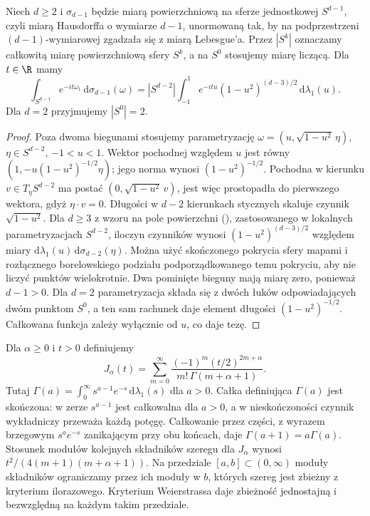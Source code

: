 \begin{lemat}
\label{lem:dt-fourier-sphere-kernel}
Niech $d\ge2$ i $\sigma_{d-1}$ będzie miarą powierzchniową
na sferze jednostkowej $S^{d-1}$, czyli miarą Hausdorffa
o wymiarze $d-1$, unormowaną tak, by na podprzestrzeni
$(d-1)$-wymiarowej zgadzała się z miarą Lebesgue'a.
Przez $|S^k|$ oznaczamy całkowitą miarę powierzchniową
sfery $S^k$, a na $S^0$ stosujemy miarę liczącą.
Dla $t\in\R$ mamy
\[
 \int_{S^{d-1}}e^{-it\omega_1}\,\mathrm d\sigma_{d-1}(\omega)
 =|S^{d-2}|\int_{-1}^1 e^{-itu}(1-u^2)^{(d-3)/2}
 \,\mathrm d\lambda_1(u).
\]
Dla $d=2$ przyjmujemy $|S^0|=2$.
\end{lemat}
\begin{proof}
Poza dwoma biegunami stosujemy parametryzację
$\omega=(u,\sqrt{1-u^2}\,\eta)$, $\eta\in S^{d-2}$,
$-1<u<1$. Wektor pochodnej względem $u$ jest równy
$(1,-u(1-u^2)^{-1/2}\eta)$; jego norma wynosi
$(1-u^2)^{-1/2}$. Pochodna w kierunku
$v\in T_\eta S^{d-2}$ ma postać
$(0,\sqrt{1-u^2}\,v)$, jest więc prostopadła do
pierwszego wektora, gdyż $\eta\cdot v=0$. Długości w $d-2$ kierunkach stycznych
skaluje czynnik $\sqrt{1-u^2}$. Dla $d\ge3$ z wzoru na pole
powierzchni (),
zastosowanego w lokalnych parametryzacjach $S^{d-2}$,
iloczyn czynników wynosi
$(1-u^2)^{(d-3)/2}$ względem miary
$\mathrm d\lambda_1(u)\,\mathrm d\sigma_{d-2}(\eta)$.
Można użyć skończonego pokrycia sfery mapami i rozłącznego
borelowskiego podziału podporządkowanego temu pokryciu,
aby nie liczyć punktów wielokrotnie. Dwa pominięte
bieguny mają miarę zero, ponieważ $d-1>0$.
Dla $d=2$ parametryzacja składa się z dwóch łuków
odpowiadających dwóm punktom $S^0$, a ten sam
rachunek daje element długości $(1-u^2)^{-1/2}$.
Całkowana funkcja zależy wyłącznie od $u$, co daje tezę.
\end{proof}

\begin{definicja}
\label{def:dt-bessel-j}
Dla $\alpha\ge0$ i $t>0$ definiujemy
\[
 J_\alpha(t)=\sum_{m=0}^\infty
 \frac{(-1)^m(t/2)^{2m+\alpha}}
      {m!\,\Gamma(m+\alpha+1)}.
\]
Tutaj $\Gamma(a)=\int_0^\infty
s^{a-1}e^{-s}\,\mathrm d\lambda_1(s)$ dla $a>0$.
Całka definiująca $\Gamma(a)$ jest skończona:
w zerze $s^{a-1}$ jest całkowalna dla $a>0$,
a w nieskończoności czynnik wykładniczy przeważa
każdą potęgę. Całkowanie przez części, z wyrazem
brzegowym $s^ae^{-s}$ zanikającym przy obu końcach,
daje $\Gamma(a+1)=a\Gamma(a)$. Stosunek modułów
kolejnych składników szeregu dla $J_\alpha$ wynosi
$t^2/(4(m+1)(m+\alpha+1))$.
Na przedziale $[a,b]\subset(0,\infty)$ moduły
składników ograniczamy przez ich moduły w $b$,
których szereg jest zbieżny z kryterium ilorazowego.
Kryterium Weierstrassa daje zbieżność jednostajną
i bezwzględną na każdym takim przedziale.
\end{definicja}

